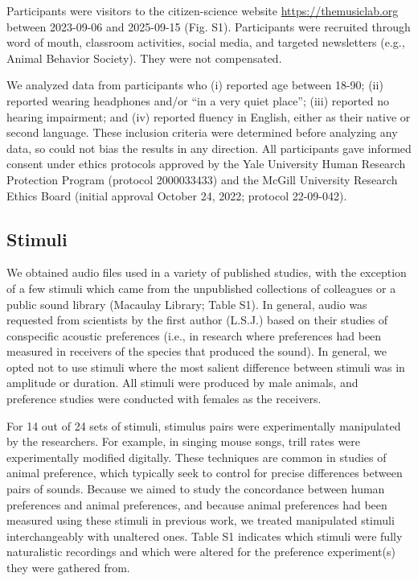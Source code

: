 \documentclass[
]{article}
\begin{document}
Participants were visitors to the citizen-science website
\url{https://themusiclab.org} between 2023-09-06 and 2025-09-15 (Fig.
S1). Participants were recruited through word of mouth, classroom
activities, social media, and targeted newsletters (e.g., Animal
Behavior Society). They were not compensated.

We analyzed data from participants who (i) reported age between 18-90;
(ii) reported wearing headphones and/or ``in a very quiet place''; (iii)
reported no hearing impairment; and (iv) reported fluency in English,
either as their native or second language. These inclusion criteria were
determined before analyzing any data, so could not bias the results in
any direction. All participants gave informed consent under ethics
protocols approved by the Yale University Human Research Protection
Program (protocol 2000033433) and the McGill University Research Ethics
Board (initial approval October 24, 2022; protocol 22-09-042).

\subsection{Stimuli}\label{stimuli}

We obtained audio files used in a variety of published studies, with the
exception of a few stimuli which came from the unpublished collections
of colleagues or a public sound library (Macaulay Library; Table S1). In
general, audio was requested from scientists by the first author
(L.S.J.) based on their studies of conspecific acoustic preferences
(i.e., in research where preferences had been measured in receivers of
the species that produced the sound). In general, we opted not to use
stimuli where the most salient difference between stimuli was in
amplitude or duration. All stimuli were produced by male animals, and
preference studies were conducted with females as the receivers.

For 14 out of 24 sets of stimuli, stimulus pairs were experimentally
manipulated by the researchers. For example, in singing mouse songs,
trill rates were experimentally modified digitally. These techniques are
common in studies of animal preference, which typically seek to control
for precise differences between pairs of sounds. Because we aimed to
study the concordance between human preferences and animal preferences,
and because animal preferences had been measured using these stimuli in
previous work, we treated manipulated stimuli interchangeably with
unaltered ones. Table S1 indicates which stimuli were fully naturalistic
recordings and which were altered for the preference experiment(s) they
were gathered from.
\end{document}
